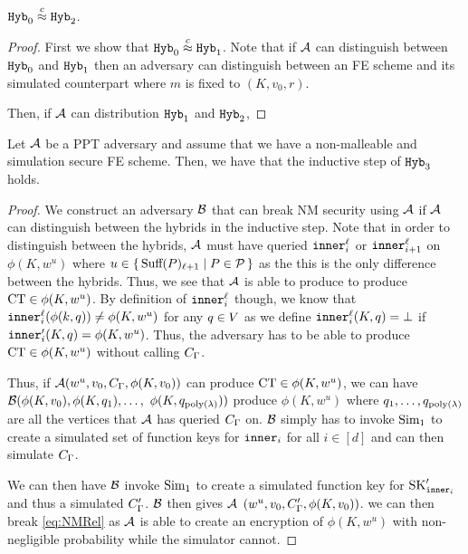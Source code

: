 \begin{lemma}
	\label{lem:hybrOneToFour}
	$\texttt{Hyb}_0 \overset{c}{\approx} \texttt{Hyb}_2$.	
	\begin{proof}
		First we show that $\texttt{Hyb}_0 \overset{c}{\approx} \texttt{Hyb}_1$. Note that if $\mathcal{A}$ can distinguish
		between $\texttt{Hyb}_0$ and $\texttt{Hyb}_1$ then an adversary can distinguish between an FE scheme and its simulated counterpart
		where $m$ is fixed to $(K, v_0, r)$.

		Then, if $\mathcal{A}$ can distribution $\texttt{Hyb}_1$ and $\texttt{Hyb}_2$, 
		
	\end{proof}
\end{lemma}


\begin{lemma}
		\label{lem:NMIndep}
		Let $\mathcal{A}$ be a PPT adversary and assume that we have a non-malleable and simulation secure
		FE scheme. Then, we have that the inductive step of $\texttt{Hyb}_3$ holds.
		\begin{proof}
			We construct an adversary $\mathcal{B}$ that can break NM security using $\mathcal{A}$ if $\mathcal{A}$ can distinguish between the hybrids
			in the inductive step.
			Note that in order to distinguish between the hybrids, $\mathcal{A}$ must have queried $\texttt{inner}^\ell_i$ or $\texttt{inner}^\ell_{i + 1}$ on $\phi(K, w^u)$ where $u \in \set{\text{Suff}(P)_{\ell + 1} \mid P \in \mathcal{P}}$
			as the this is the only difference between the hybrids.
			Thus, we see that $\mathcal{A}$ is able to produce to produce $\text{CT} \in \phi(K, w^u)$.
			By definition of $\texttt{inner}_i^\ell$ though, we know that $\texttt{inner}_i^\ell(\phi(k, q)) \neq \phi(K, w^u)$
			for any $q \in V$ as we define $\texttt{inner}_i^\ell(K, q) = \bot$ if $\texttt{inner}_i'(K, q) = \phi(K, w^u)$.
			Thus, the adversary has to be able to produce $\text{CT} \in \phi(K, w^u)$ without calling $C_\Gamma$.

			Thus, if $\mathcal{A}(w^u, v_0, C_\Gamma, \phi(K, v_0))$ can produce $\text{CT} \in \phi(K, w^u)$,
			we can have $\mathcal{B}(\phi(K, v_0), \phi(K, q_1), \dots,$ $ \phi(K,q_{\operatorname{poly}(\lambda)}))$ 
			produce $\phi(K, w^u)$ where $q_1, \dots, q_{\operatorname{poly}(\lambda)}$ are all the vertices that $\mathcal{A}$ has queried $C_\Gamma$ on.
			$\mathcal{B}$ simply has to invoke $\text{Sim}_1$ to create a simulated set of function keys for $\texttt{inner}_i$ for all $i \in [d]$
			and can then simulate $C_\Gamma$.

			We can then have $\mathcal{B}$ invoke $\text{Sim}_1$ to create a simulated function key for $\text{SK}_{\texttt{inner}_i}'$
			and thus a simulated $C_\Gamma'$.
			$\mathcal{B}$ then gives $\mathcal{A}$ $(w^u, v_0, C_\Gamma', \phi(K, v_0))$.
			we can then break \cref{eq:NMRel} as $\mathcal{A}$ is able to create an encryption of $\phi(K, w^u)$ with non-negligible probability while the simulator cannot.
		\end{proof}
\end{lemma}

